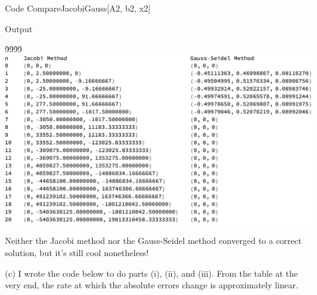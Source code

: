 \documentclass[12pt,twoside,openany]{memoir}
\begin{document}
\begin{mmaCell}[functionlocal=y]{Code}
CompareJacobiGauss[A2, b2, x2]
\end{mmaCell}
\begin{mmaCell}{Output}
    
\end{mmaCell}
\vspace{-5pt}\h9\h9\h9\h9\includegraphics[scale=0.58]{hw5q1p2.pdf}

\noindent Neither the Jacobi method nor the Gauss-Seidel method converged to a correct solution, but it's still cool nonetheless!
\vspace{25pt}

\noindent (c) I wrote the code below to do parts (i), (ii), and (iii). From the table at the very end, the rate at which the absolute errors change is approximately linear.
\end{document}
